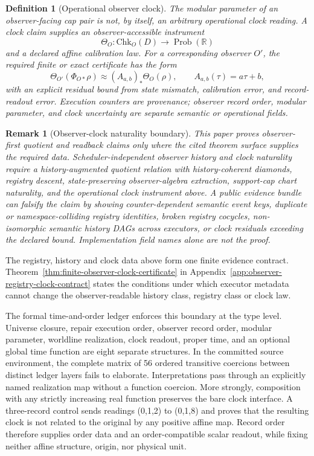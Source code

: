 \documentclass[11pt]{article}
\newtheorem{definition}[theorem]{Definition}
\newtheorem{remark}[theorem]{Remark}
\begin{document}
\begin{definition}[Operational observer clock]\label{def:operational-observer-clock}
The modular parameter of an observer-facing cap pair is not, by itself, an arbitrary operational
clock reading. A clock claim supplies an observer-accessible instrument
\[
\Theta_O:\mathrm{Chk}_O(D)\to\operatorname{Prob}(\mathbb R)
\]
and a declared affine calibration law. For a corresponding observer \(O'\), the required finite
or exact certificate has the form
\[
\Theta_{O'}(\Phi_{O*}\rho)
\approx
(A_{a,b})_*\Theta_O(\rho),
\qquad
A_{a,b}(\tau)=a\tau+b,
\]
with an explicit residual bound from state mismatch, calibration error, and record-readout error.
Execution counters are provenance; observer record order, modular parameter, and clock
uncertainty are separate semantic or operational fields.
\end{definition}

\begin{remark}[Observer-clock naturality boundary]\label{rem:observer-clock-naturality-gate}
This paper proves observer-first quotient and readback claims only where the cited theorem
surface supplies the required data. Scheduler-independent observer history and clock naturality
require a history-augmented quotient relation with history-coherent diamonds, registry descent,
state-preserving observer-algebra extraction, support-cap chart naturality, and the operational
clock instrument above. A public evidence bundle can falsify the claim by showing counter-dependent
semantic event keys, duplicate or namespace-colliding registry identities, broken registry
cocycles, non-isomorphic semantic history DAGs across executors, or clock residuals exceeding the
declared bound. Implementation field names alone are not the proof.
\end{remark}

The registry, history and clock data above form one finite evidence contract.
Theorem~\ref{thm:finite-observer-clock-certificate} in
Appendix~\ref{app:observer-registry-clock-contract} states the conditions under
which executor metadata cannot change the observer-readable history class,
registry class or clock law.

The formal time-and-order ledger enforces this boundary at the type level.
Universe closure, repair execution order, observer record order, modular
parameter, worldline realization, clock readout, proper time, and an optional
global time function are eight separate structures. In the committed source
environment, the complete matrix of 56 ordered transitive coercions between
distinct ledger layers fails to elaborate. Interpretations pass through an
explicitly named realization map without a function coercion. More strongly,
composition with any strictly increasing real function preserves the bare
clock interface. A three-record control sends readings (0,1,2) to
(0,1,8) and proves that the resulting clock is not related to the original
by any positive affine map. Record order therefore supplies order data and an
order-compatible scalar readout, while fixing
neither affine structure, origin, nor physical unit.
\end{document}
